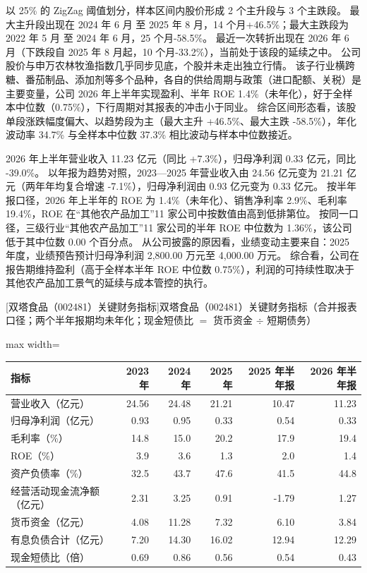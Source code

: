 以 25\% 的 ZigZag 阈值划分，样本区间内股价形成 2 个主升段与 3 个主跌段。 最大主升段出现在 2024 年 6 月 至 2025 年 8 月，14 个月+46.5\%；最大主跌段为 2022 年 5 月 至 2024 年 6 月，25 个月-58.5\%。 最近一次转折出现在 2026 年 6 月（下跌段自 2025 年 8 月起，10 个月-33.2\%），当前处于该段的延续之中。 公司股价与申万农林牧渔指数几乎同步见底，个股并未走出独立行情。 该子行业横跨糖、番茄制品、添加剂等多个品种，各自的供给周期与政策（进口配额、关税）是主要变量，公司 2026 年上半年实现盈利、半年 ROE 1.4\%（未年化），好于全样本中位数（0.75\%），下行周期对其报表的冲击小于同业。 综合区间形态看，该股单段涨跌幅度偏大、以趋势段为主（最大主升 +46.5\%、最大主跌 -58.5\%），年化波动率 34.7\% 与全样本中位数 37.3\% 相比波动与样本中位数接近。

 2026 年上半年营业收入 11.23 亿元（同比 +7.3\%），归母净利润 0.33 亿元，同比 -39.0\%。 以年报为趋势对照，2023---2025 年营业收入由 24.56 亿元变为 21.21 亿元（两年年均复合增速 -7.1\%），归母净利润由 0.93 亿元变为 0.33 亿元。 按半年报口径，2026 年上半年的 ROE 为 1.4\%（未年化）、销售净利率 2.9\%、毛利率 19.4\%，ROE 在“其他农产品加工”11 家公司中按数值由高到低排第位。 按同一口径，三级行业“其他农产品加工”11 家公司的半年 ROE 中位数为 1.36\%，该公司低于其中位数 0.00 个百分点。 从公司披露的原因看，业绩变动主要来自：2025 年度，业绩预告预计归母净利润 2,800.00 万元至 4,000.00 万元。 综合看，公司在报告期维持盈利（高于全样本半年 ROE 中位数 0.75\%），利润的可持续性取决于其他农产品加工景气的延续与成本管控的执行。

\begin{center}\small\setlength{\tabcolsep}{3.4pt}
[双塔食品（002481）关键财务指标]{双塔食品（002481）关键财务指标（合并报表口径；两个半年报期均未年化；现金短债比 $=$ 货币资金 $\div$ 短期债务）}
\begin{adjustbox}{max width=\textwidth}
\begin{tabular}{@{}lrrrrr@{}}
\toprule
指标 & 2023 年 & 2024 年 & 2025 年 & 2025 年半年报 & 2026 年半年报 \\
\midrule
营业收入（亿元） & 24.56 & 24.48 & 21.21 & 10.47 & 11.23 \\
归母净利润（亿元） & 0.93 & 0.95 & 0.33 & 0.54 & 0.33 \\
毛利率（\%） & 14.8 & 15.0 & 20.2 & 17.9 & 19.4 \\
ROE（\%） & 3.9 & 3.6 & 1.3 & 2.0 & 1.4 \\
资产负债率（\%） & 32.5 & 43.7 & 47.6 & 41.5 & 44.8 \\
经营活动现金流净额（亿元） & 2.31 & 3.25 & 0.91 & -1.79 & 1.27 \\
货币资金（亿元） & 4.08 & 11.28 & 7.32 & 6.10 & 3.84 \\
有息负债合计（亿元） & 7.20 & 14.30 & 16.02 & 12.94 & 12.29 \\
现金短债比（倍） & 0.69 & 0.86 & 0.56 & 0.54 & 0.43 \\
\bottomrule
\end{tabular}
\end{adjustbox}
\end{center}

